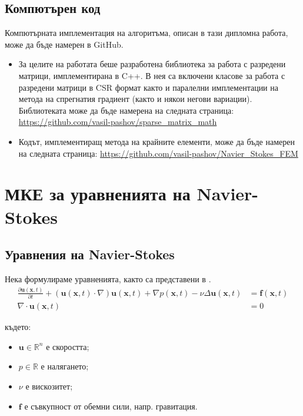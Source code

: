 \documentclass[12pt]{report}
\begin{document}
\section{Компютърен код}
Компютърната имплементация на алгоритъма, описан в тази дипломна работа, може да бъде намерен в GitHub.
\begin{itemize}
    \item За целите на работата беше разработена библиотека за работа с разредени матрици, имплементирана в C++. В нея са включени класове за работа с разредени матрици в CSR формат както и паралелни имплементации на метода на спрегнатия градиент (както и някои негови вариации). Библиотеката може да бъде намерена на следната страница: \url{https://github.com/vasil-pashov/sparse_matrix_math}
    \item Кодът, имплементиращ метода на крайните елементи, може да бъде намерен на следната страница: \url{https://github.com/vasil-pashov/Navier_Stokes_FEM}
\end{itemize}

\chapter{МКЕ за уравненията на Navier-Stokes}\label{ch:FEM-NS}
\section{Уравнения на  Navier-Stokes}
Нека формулираме уравненията, както са представени в \cite{Larson-Bengzon}.
\begin{equation}
\begin{aligned}
  \frac{\partial \mathbf{u}(\mathbf{x}, t)}{\partial t} + \left(\mathbf{u}(\mathbf{x}, t)\cdot\nabla\right)\mathbf{u}(\mathbf{x}, t) + \nabla p(\mathbf{x}, t) - \nu\Delta\mathbf{u}(\mathbf{x}, t) &= \mathbf{f}(\mathbf{x}, t)\\
  \nabla \cdot \mathbf{u}(\mathbf{x}, t) &= 0
\end{aligned}\label{eq:NS}
\end{equation}

където:
\begin{itemize}
  \item $\mathbf{u} \in \mathbb{R}^n$ е скоростта;
  \item $p \in \mathbb{R}$ е налягането;
  \item $\nu$ е вискозитет;
  \item $\mathbf{f}$ е съвкупност от обемни сили, напр. гравитация.
\end{itemize}
\end{document}
